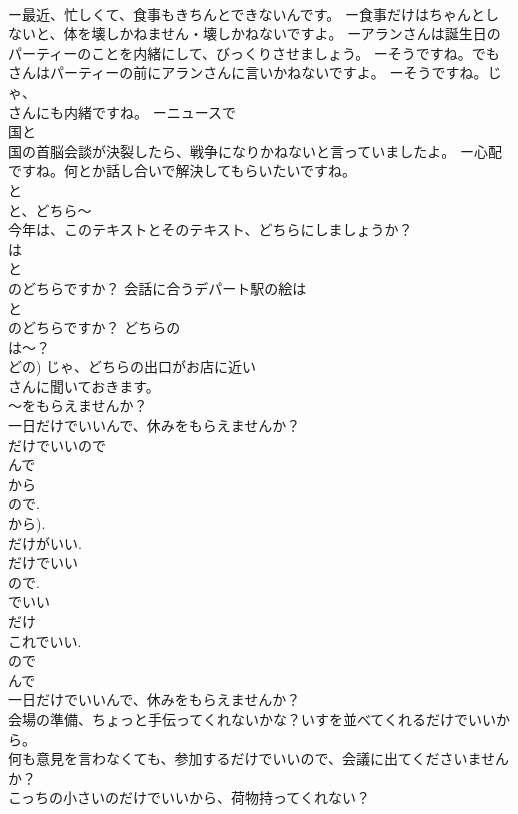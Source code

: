 \documentclass[8pt]{extreport}
\begin{document}
\begin{CJK}{UTF8}{min}
\\	ー最近、忙しくて、食事もきちんとできないんです。 ー食事だけはちゃんとしないと、体を壊しかねません・壊しかねないですよ。 ーアランさんは誕生日のパーティーのことを内緒にして、びっくりさせましょう。 ーそうですね。でも
\\	さんはパーティーの前にアランさんに言いかねないですよ。 ーそうですね。じゃ、
\\	さんにも内緒ですね。 ーニュースで
\\	国と
\\	国の首脳会談が決裂したら、戦争になりかねないと言っていましたよ。 ー心配ですね。何とか話し合いで解決してもらいたいですね。
\\	と
\\	と、どちら～	
\\	今年は、このテキストとそのテキスト、どちらにしましょうか？ 
\\	は
\\	と
\\	のどちらですか？ 会話に合うデパート駅の絵は
\\	と
\\	のどちらですか？ どちらの
\\	は～？ 
\\	どの) じゃ、どちらの出口がお店に近い
\\	さんに聞いておきます。
\\	～をもらえませんか？	
\\	一日だけでいいんで、休みをもらえませんか？ 
\\	だけでいいので	
\\	んで 
\\	から 
\\	ので. 
\\	から). 
\\	だけがいい. 
\\	だけでいい
\\	ので. 
\\	でいい 
\\	だけ 
\\	これでいい. 
\\	ので 
\\	んで 
\\	一日だけでいいんで、休みをもらえませんか？ 
\\	会場の準備、ちょっと手伝ってくれないかな？いすを並べてくれるだけでいいから。 
\\	何も意見を言わなくても、参加するだけでいいので、会議に出てくださいませんか？ 
\\	こっちの小さいのだけでいいから、荷物持ってくれない？ 

\end{CJK}
\end{document}
